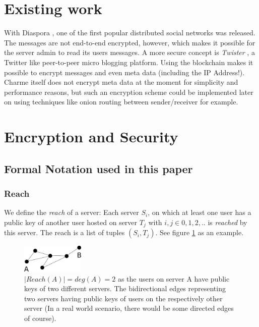 \documentclass{scrartcl}
\begin{document}
 \section{Existing work}
With Diaspora \cite{diaspora}, one of the first popular distributed social networks was released. The messages are not end-to-end encrypted, however, which makes it possible for the server admin to read its users messages. 
A more secure concept is \textit{Twister} \cite{twister}, a Twitter like peer-to-peer micro blogging platform. Using the blockchain makes it possible to encrypt messages and even meta data (including the IP Address!). Charme itself does not encrypt meta data at the moment for simplicity and performance reasons, but such an encryption scheme could be implemented later on using techniques like onion routing between sender/receiver for example.

\newpage
 \section{Encryption and Security}

\subsection{Formal Notation used in this paper}
\subsubsection{Reach}
 We define the \textit{reach} of a server: Each server $S_i$, on which at least one user has a public key of another user hosted on server $T_j$ with $i,j \in {0,1,2,..}$ is \textit{reached} by this server.
The reach is a list of tuples $(S_i, T_j)$. See figure \ref{figContextGraph} as an example.

\begin{figure}[ht]
	\centering
    \includegraphics[width=30mm]{illustrations/graph.pdf}

	\caption{$|Reach(A)| = deg(A) = 2
$ as the users on server A have public keys of two different servers. The bidirectional edges representing two servers having public keys of users on the respectively other server (In a real world scenario, there would be some directed edges of course). }
	\label{figContextGraph}
\end{figure}
\end{document}
